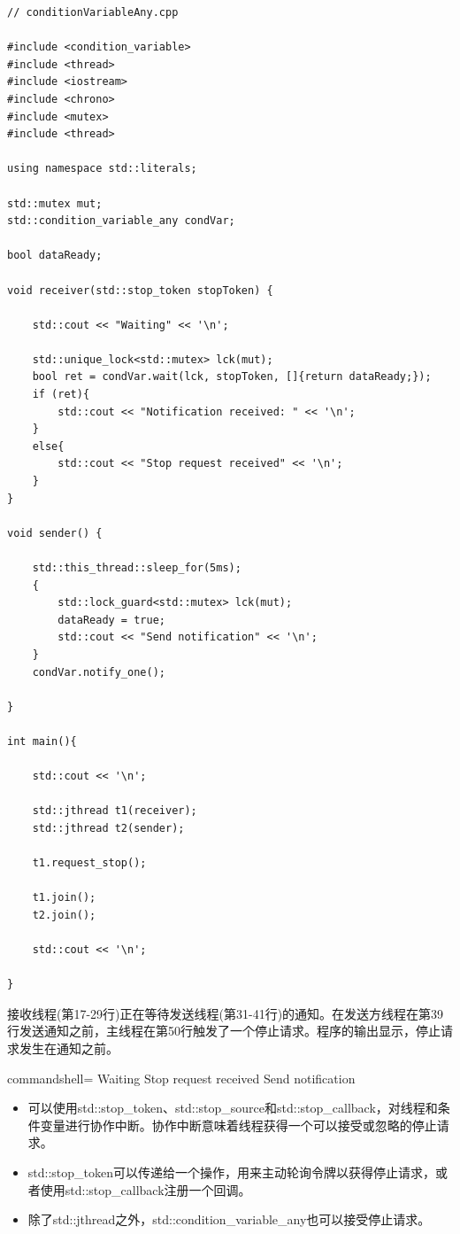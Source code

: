 \begin{lstlisting}[style=styleCXX]
// conditionVariableAny.cpp

#include <condition_variable>
#include <thread>
#include <iostream>
#include <chrono>
#include <mutex>
#include <thread>

using namespace std::literals;

std::mutex mut;
std::condition_variable_any condVar;

bool dataReady;

void receiver(std::stop_token stopToken) {

	std::cout << "Waiting" << '\n';
	
	std::unique_lock<std::mutex> lck(mut);
	bool ret = condVar.wait(lck, stopToken, []{return dataReady;});
	if (ret){
		std::cout << "Notification received: " << '\n';
	}
	else{
		std::cout << "Stop request received" << '\n';
	}
}

void sender() {

	std::this_thread::sleep_for(5ms);
	{
		std::lock_guard<std::mutex> lck(mut);
		dataReady = true;
		std::cout << "Send notification" << '\n';
	}
	condVar.notify_one();

}

int main(){

	std::cout << '\n';
	
	std::jthread t1(receiver);
	std::jthread t2(sender);
	
	t1.request_stop();
	
	t1.join();
	t2.join();
	
	std::cout << '\n';

}
\end{lstlisting}

接收线程(第17-29行)正在等待发送线程(第31-41行)的通知。在发送方线程在第39行发送通知之前，主线程在第50行触发了一个停止请求。程序的输出显示，停止请求发生在通知之前。

\begin{tcblisting}{commandshell={}}
Waiting
Stop request received
Send notification
\end{tcblisting}

\begin{tcolorbox}[breakable,enhanced jigsaw,colback=mygreen!5!white,colframe=mygreen!75!black,title={总结}]
	
\begin{itemize}
\item 
可以使用std::stop\_token、std::stop\_source和std::stop\_callback，对线程和条件变量进行协作中断。协作中断意味着线程获得一个可以接受或忽略的停止请求。

\item 
std::stop\_token可以传递给一个操作，用来主动轮询令牌以获得停止请求，或者使用std::stop\_callback注册一个回调。

\item 
除了std::jthread之外，std::condition\_variable\_any也可以接受停止请求。
\end{itemize}
	
\end{tcolorbox}



\newpage















